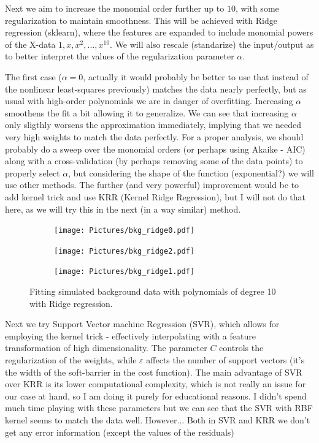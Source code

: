 \documentclass{article}
\begin{document}
Next we aim to increase the monomial order further up to $10$, with some regularization to maintain smoothness. This will be achieved with Ridge regression (sklearn), where the features are expanded to include monomial powers of the X-data $1, x, x^2, \dots, x^{10}$.
We will also rescale (standarize) the input/output as to better interpret the values of the regularization parameter $\alpha$.

The first case ($\alpha=0$, actually it would probably be better to use that instead of the nonlinear least-squares previously)
matches the data nearly perfectly, but as usual with high-order polynomials we are in danger of overfitting. Increasing $\alpha$ smoothens the fit a bit allowing it to generalize. We can see that increasing $\alpha$ only sligthly worsens the approximation immediately, implying that we needed very high weights to match the data perfectly.
For a proper analysis, we should probably do a sweep over the monomial orders (or perhaps using Akaike - AIC) along with a cross-validation (by perhaps removing some of the data points) to properly select $\alpha$, but considering the shape of the function (exponential?) we will use other methods.
The further (and very powerful) improvement would be to add kernel trick and use KRR (Kernel Ridge Regression), but I will not do that here, as we will try this in the next (in a way similar) method.

\begin{figure}[H]
\centering
\begin{subfigure}{.33\textwidth}
\texttt{[image: Pictures/bkg\_ridge0.pdf]}
\end{subfigure}
\begin{subfigure}{.33\textwidth}
\texttt{[image: Pictures/bkg\_ridge2.pdf]}
\end{subfigure}
\begin{subfigure}{.33\textwidth}
\texttt{[image: Pictures/bkg\_ridge1.pdf]}
\end{subfigure}
\caption*{Fitting simulated background data with polynomials of degree 10 with Ridge regression.}
\end{figure}

Next we try Support Vector machine Regression (SVR), which allows for employing the kernel trick - effectively interpolating with a feature transformation of high dimensionality. The parameter $C$ controls the regularization of the weights, while $\varepsilon$ affects the number of support vectors (it's the width of the soft-barrier in the cost function). The main advantage of SVR over KRR is its lower computational complexity, which is not really an issue for our case at hand, so I am doing it purely for educational reasons. I didn't spend much time playing with these parameters but we can see that the SVR with RBF kernel seems to match the data well. However... Both in SVR and KRR we don't get any error information (except the values of the residuals)
\end{document}
